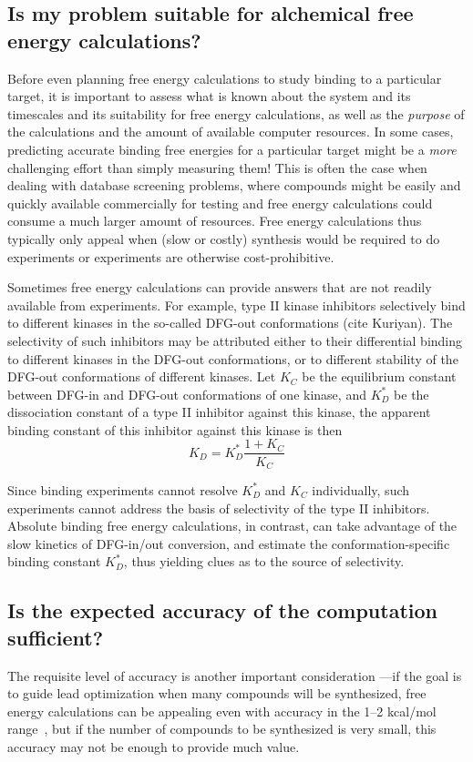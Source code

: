 \documentclass[9pt,bestpractices]{livecoms}
\begin{document}
\subsection{Is my problem suitable for alchemical free energy calculations?}
Before even planning free energy calculations to study binding to a
particular target, it is important to assess what is known about the
system and its timescales and its suitability for free energy
calculations, as well as the \emph{purpose} of the calculations and
the amount of available computer resources. In some cases, predicting
accurate binding free energies for a particular target might be a
\emph{more} challenging effort than simply measuring them! This is
often the case when dealing with database screening problems, where
compounds might be easily and quickly available commercially for
testing and free energy calculations could consume a much larger
amount of resources. Free energy calculations thus typically only
appeal when (slow or costly) synthesis would be required to do
experiments or experiments are otherwise cost-prohibitive.

Sometimes free energy calculations can provide answers that are not
readily available from experiments.  For example, type II kinase
inhibitors selectively bind to different kinases in the so-called
DFG-out conformations (cite Kuriyan).  The selectivity of such
inhibitors may be attributed either to their differential binding to
different kinases in the DFG-out conformations, or to different
stability of the DFG-out conformations of different kinases.  Let
$K_C$ be the equilibrium constant between DFG-in and DFG-out
conformations of one kinase, and $K_D^\ast$ be the dissociation
constant of a type II inhibitor against this kinase, the apparent
binding constant of this inhibitor against this kinase is then
\begin{equation}
  K_D = K_D^\ast \frac{1 + K_C}{K_C}
  \label{eqn:conformational-binding}
\end{equation}

Since binding experiments cannot resolve $K_D^\ast$ and $K_C$ individually, such experiments cannot address the basis of selectivity of the type II inhibitors.  Absolute binding free energy calculations, in contrast, can take advantage of the slow kinetics of DFG-in/out conversion, and estimate the conformation-specific binding constant $K_D^\ast$, thus yielding clues as to the source of selectivity.

\subsection{Is the expected accuracy of the computation sufficient?}
The requisite level of accuracy is another important consideration ---if the
goal is to guide lead optimization when many compounds will be
synthesized, free energy calculations can be appealing even with
accuracy in the 1--2 kcal/mol range~\cite{mobley2012perspective}, but if the number of compounds to be synthesized is very small, this accuracy may not be enough to provide
much value.
\end{document}
